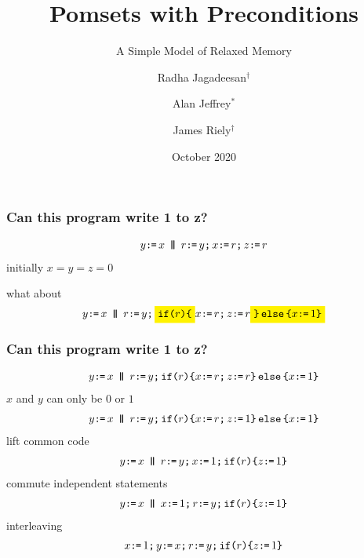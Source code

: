 \documentclass[t]{beamer} %
\title{Pomsets with Preconditions}
\subtitle{A Simple Model of Relaxed Memory}
\author{Radha Jagadeesan$^\dagger$ \and Alan Jeffrey$^*$ \and James Riely$^\dagger$}
\date{October 2020}
\institute{$^\dagger$DePaul University \and $^*$Mozilla Research and the Servo Project}
\begin{document}
\begin{frame}
  \maketitle
\end{frame}

\begin{frame}
  \frametitle{Can this program write 1 to z?}
  \begin{gather*}
    y\GETS x
    \PAR
    r\GETS y\SEMI
    x\GETS r\SEMI
    z\GETS r
  \end{gather*}
  initially $x=y=z=0$

 
  \pause
  \vspace{1in}
  what about
  \begin{gather*}
    y\GETS x
    \PAR
    r\GETS y\SEMI
    \highlight{\IF{r}\THEN} x\GETS r\SEMI z\GETS r \highlight{\ELSE x\GETS1 \FI}
  \end{gather*}
\end{frame}

\begin{frame}
  \frametitle{Can this program write 1 to z?}
  \begin{gather*}
    y\GETS x
    \PAR
    r\GETS y\SEMI
    \IF{r}\THEN x\GETS r\SEMI z\GETS r \ELSE x\GETS1 \FI
  \end{gather*}
  \pause
  $x$ and $y$ can only be $0$ or $1$  
  \begin{gather*}
    y\GETS x
    \PAR
    r\GETS y\SEMI
    \IF{r}\THEN x\GETS r\SEMI z\GETS 1 \ELSE x\GETS1 \FI
  \end{gather*}
  \pause
  lift common code
\begin{gather*}
  y\GETS x
  \PAR
  r\GETS y\SEMI
  x\GETS1\SEMI
  \IF{r}\THEN z\GETS 1 \FI
\end{gather*}
  \pause
  commute independent statements
\begin{gather*}
  y\GETS x
  \PAR
  x\GETS1\SEMI
  r\GETS y\SEMI
  \IF{r}\THEN z\GETS 1 \FI
\end{gather*}
  \pause
  interleaving
\begin{gather*}
  x\texttt{:}\mkern-1mu\texttt{=}\,1\texttt{;}\,\allowbreak
  y\texttt{:}\mkern-1mu\texttt{=}\, x\texttt{;}\,\allowbreak
  r\texttt{:}\mkern-1mu\texttt{=}\, y\texttt{;}\,\allowbreak
  \texttt{if}\allowbreak\texttt{(}r\texttt{)}\allowbreak\texttt{\{} z\texttt{:}\mkern-1mu\texttt{=}\, 1 \texttt{\}}
\end{gather*}
\end{frame}
\end{document}
